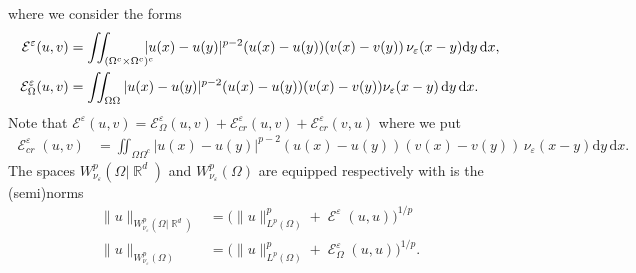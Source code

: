 \documentclass[12pt, reqno]{amsart}%
\theoremstyle{plain}  %
\theoremstyle{definition}  %
\numberwithin{equation}{section}
\DeclareMathOperator{\cE}{\mathcal{E}}
\DeclareMathOperator{\R}{\mathbb{R}}
\newcommand{\iil}{\iint}
\renewcommand{\d}{\mathrm{d}}
\newcommand{\eps}{\varepsilon}
\newcommand{\WnuOmRa}{W^p_{\nu_\eps}(\Omega|\R^d )}
\newcommand{\WnuOma}{W^{p}_{\nu_\eps}(\Omega)}
\begin{document}
where we consider the forms
\begin{align*}
\mathcal{E}^{\eps}(u,v) &= \iil_{(\Omega^c\times \Omega^c)^c}\hspace*{-2ex}|u(x)-u(y)|^{p-2}(u(x)-u(y))(v(x)-v(y) )\, \nu_\eps(x-y) \d y \, \d x,
\\ \mathcal{E}^{\eps}_{\Omega}(u,v) &=  \iil_{\Omega \Omega} |u(x)-u(y)|^{p-2}(u(x)-u(y))(v(x)-v(y)) \nu_\eps(x-y)\, \d y \, \d x.
\end{align*}
Note that $\mathcal{E}^{\eps}(u,v) =\mathcal{E}^{\eps}_\Omega(u,v) +\mathcal{E}^{\eps}_{cr}(u,v)+ \mathcal{E}^{\eps}_{cr}(v,u) $ where we put
\begin{align*}
\cE^\eps_{cr}(u,v)&= \iil_{\Omega \Omega^c} |u(x)-u(y)|^{p-2}(u(x)-u(y))(v(x)-v(y)) \, \nu_\eps(x-y)\d y \, \d x.
\end{align*}
The spaces $\WnuOmRa$ and $\WnuOma$ are equipped respectively with is the (semi)norms
\begin{align*}
\|u\|_{\WnuOmRa} &=
\big( \|u\|^p_{L^p(\Omega)}+ \cE^\eps(u,u)\big) ^{1/p} \\
\|u\|_{\WnuOma} &=
\big( \|u\|^p_{L^p(\Omega)}+ \cE^\eps_\Omega(u,u)\big) ^{1/p}.
\end{align*}
\end{document}

